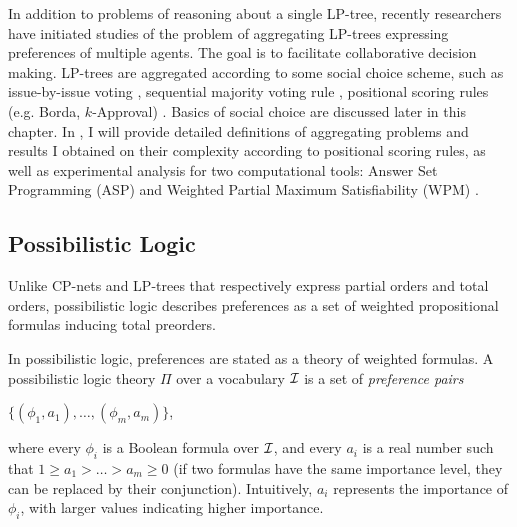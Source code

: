 %
%	  
%	

In addition to problems of reasoning about a single
LP-tree, recently researchers have initiated studies of
the problem of aggregating LP-trees expressing preferences of multiple
agents. The goal is to facilitate collaborative decision making.
LP-trees are aggregated
according to some social choice scheme, such as
issue-by-issue voting \cite{fargier:ibi},
sequential majority voting rule \cite{Xia:SMV},
positional scoring rules (e.g. Borda, $k$-Approval) \cite{lang,LiuT}.
Basics of social choice are discussed later in this chapter.
In , I will provide detailed definitions of aggregating
problems and results I obtained on their complexity 
according to positional scoring rules, as
well as experimental analysis for two computational tools:
Answer Set Programming (ASP) \cite{aspataglance} and 
Weighted Partial Maximum Satisfiability (WPM) \cite{papado:b:compcomplexity}.


\subsection{Possibilistic Logic}
Unlike CP-nets and LP-trees that respectively express partial orders and total orders,
possibilistic logic \cite{DuboisLP91} describes preferences as a set of weighted propositional
formulas inducing total preorders.

In possibilistic logic, preferences are stated as a theory of weighted formulas.
A possibilistic logic theory $\Pi$ over a vocabulary $\mathcal{I}$ is a set of 
\emph{preference pairs}
\begin{center}
	$\{ (\phi_1,a_1), \ldots, (\phi_m,a_m) \}$,
\end{center}
where every $\phi_i$ is a Boolean formula over $\mathcal{I}$, and every $a_i$ is a real number
such that $1\geq a_1>\ldots>a_m\geq 0$ (if two formulas have the same 
importance level, they can be replaced by their conjunction).
Intuitively, $a_i$ represents the importance of $\phi_i$, with larger values
indicating higher importance.


